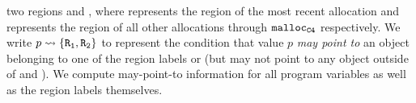 two regions  and , where  represents the region of the most recent allocation and 
represents the region of all other allocations through ${\tt malloc_{C4}}$ respectively.
We write $p \rightsquigarrow{} \{{\tt R_1}, {\tt R_2}\}$ to represent the condition that value $p$ {\em may point to}
an object belonging to one of the region labels  or 
(but may not point to any object outside of  and ). We compute may-point-to information for
all program variables as well as the region labels themselves.

